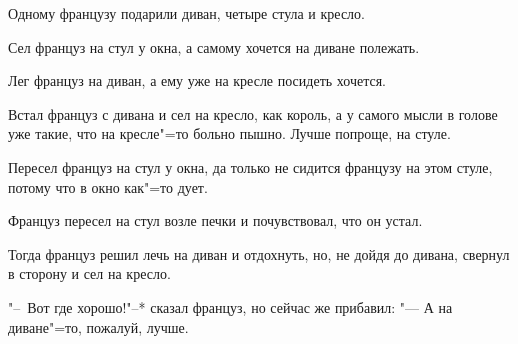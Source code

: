 Одному французу подарили диван, четыре стула и кресло.

Сел француз на стул у окна, а самому хочется на диване полежать.

Лег француз на диван, а ему уже на кресле посидеть хочется.

Встал француз с дивана и сел на кресло, как король, а у самого мысли в голове уже такие, что на кресле"=то больно пышно. Лучше попроще, на стуле.

Пересел француз на стул у окна, да только не сидится французу на этом стуле, потому что в окно как"=то дует.

Француз пересел на стул возле печки и почувствовал, что он устал.

Тогда француз решил лечь на диван и отдохнуть, но, не дойдя до дивана, свернул в сторону и сел на кресло.

"--~Вот где хорошо!"--* сказал француз, но сейчас же прибавил: "--- А на диване"=то, пожалуй, лучше.
